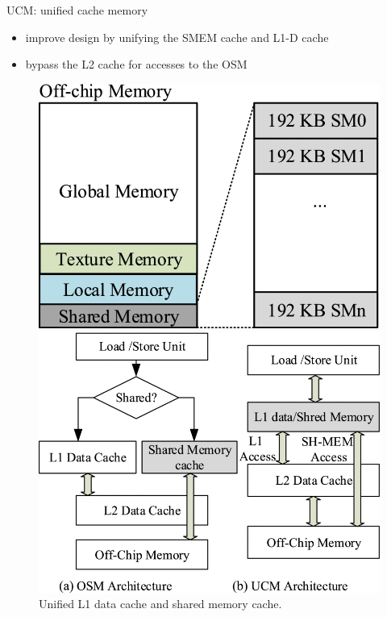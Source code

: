 \documentclass[
    fontset=fandol,
    xcolor=svgnames %
]{ctexbeamer}
\begin{document}
\begin{frame}

    \begin{block}{UCM: unified cache memory}
        \begin{itemize}
            \item improve design by unifying the SMEM cache and L1-D cache
            \item bypass the L2 cache for accesses to the OSM
        \end{itemize}
    \end{block}

    \begin{figure}
        \begin{minipage}{0.49\textwidth}
            \includegraphics[height=0.45\textheight]{assets/figure/sadro7-3154315-large.png}
            \caption{Unified addressing map to off-chip memory (a.k.a., device memory).}
        \end{minipage}
        \begin{minipage}{0.49\textwidth}
            \includegraphics[height=0.45\textheight]{assets/figure/sadro8-3154315-large.png}
            \caption{Unified L1 data cache and shared memory cache.}
        \end{minipage}
    \end{figure}

\end{frame}
\end{document}
